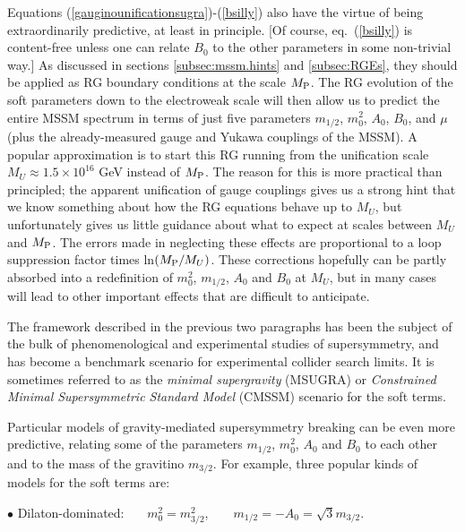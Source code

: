 \documentclass[11pt]{article}
\def\MPlanck{M_{\rm P}}
\begin{document}
Equations (\ref{gauginounificationsugra})-(\ref{bsilly}) also have the 
virtue of being extraordinarily predictive, at least in principle. 
[Of course, 
eq.~(\ref{bsilly}) is 
content-free unless one can relate $B_0$ to the other parameters in some 
non-trivial way.] As discussed in sections \ref{subsec:mssm.hints} and 
\ref{subsec:RGEs}, they should be applied as RG boundary conditions at the 
scale $\MPlanck$. The RG evolution of the soft parameters down to the 
electroweak scale will then allow us to predict the entire MSSM spectrum 
in terms of just five parameters $m_{1/2}$, $m_0^2$, $A_0$, $B_0$, and 
$\mu$ (plus the already-measured gauge and Yukawa couplings of the MSSM). 
A popular approximation is to start this RG running from the unification 
scale $M_U\approx 1.5\times 10^{16}$ GeV instead of $\MPlanck$. The reason 
for this is more practical than principled; the apparent unification of 
gauge couplings gives us a strong hint that we know something about how 
the RG equations behave up to $M_U$, but unfortunately gives us little 
guidance about what to expect at scales between $M_U$ and $\MPlanck$. The 
errors made in neglecting these effects are proportional to a loop 
suppression factor times ln$(\MPlanck/M_U)$. These corrections hopefully 
can be partly absorbed into a redefinition of $m_0^2$, $m_{1/2}$, $A_0$ 
and $B_0$ at $M_U$, but in many cases will lead to other important effects 
\cite{PP} that are difficult to anticipate. 

The framework described in the previous two paragraphs has been 
the subject of the bulk of phenomenological and experimental studies of supersymmetry,
and has become a benchmark scenario for experimental collider 
search limits. It 
is sometimes referred to as the {\it minimal supergravity} (MSUGRA) 
or {\it Constrained Minimal Supersymmetric Standard Model} (CMSSM) 
scenario for the soft terms. 

Particular models of gravity-mediated supersymmetry breaking can be even 
more predictive, relating some of the parameters $m_{1/2}$, $m_0^2$, $A_0$ 
and $B_0$ to each other and to the mass of the gravitino $m_{3/2}$. For 
example, three popular kinds of models for the soft terms are:

\vspace{.08in}

$\bullet$
Dilaton-dominated: \cite{dilatondominated}~~~$m^2_0 =
m^2_{3/2}$,~~~~$m_{1/2} = -A_0 = {\sqrt 3} m_{3/2}$.

\vspace{.02in}
\end{document}
